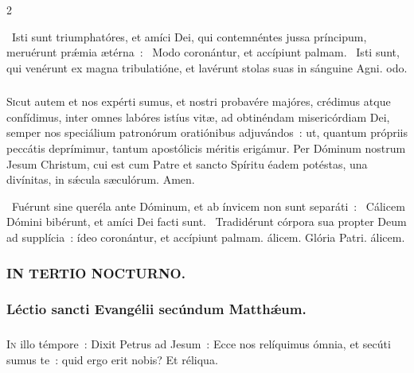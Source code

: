 \documentclass[9pt,twoside]{extarticle}
\begin{document}
\begin{multicols}{2}
{\begin{tightlist}{}
\item {}~Isti sunt triumphatóres, et amíci Dei, qui contemnéntes jussa príncipum, meruérunt prǽmia ætérna~: \textred{*}~Modo coronántur, et accípiunt palmam. ~Isti sunt, qui venérunt ex magna tribulatióne, et lavérunt stolas suas in sánguine Agni. odo.
\end{tightlist}

\subsubsection*{\center {}}
\lettrine{S}icut autem et nos expérti sumus, et nostri probavére majóres, crédimus atque confídimus, inter omnes labóres istíus vitæ, ad obtinéndam misericórdiam Dei, semper nos speciálium patronórum oratiónibus adjuvándos~: ut, quantum própriis peccátis deprímimur, tantum apostólicis méritis erigámur. Per Dóminum nostrum Jesum Christum, cui est cum Patre et sancto Spíritu éadem potéstas, una divínitas, in sǽcula sæculórum. Amen.

\begin{tightlist}{}
\item {}~Fuérunt sine queréla ante Dóminum, et ab ínvicem non sunt separáti~: \textred{*}~Cálicem Dómini bibérunt, et amíci Dei facti sunt.
~Tradidérunt córpora sua propter Deum ad supplícia~: ídeo coronántur, et accípiunt palmam. álicem. Glória Patri. álicem.
\end{tightlist}

\subsubsection*{\center \textsc{IN TERTIO NOCTURNO.}}
\subsubsection*{\center Léctio sancti Evangélii secúndum Matthǽum.}
\subsubsection*{\center {}}
\lettrine{I}n illo témpore~: Dixit Petrus ad Jesum~: Ecce nos relíquimus ómnia, et secúti sumus te~: quid ergo erit nobis? Et réliqua.

}
\end{multicols}
\end{document}
